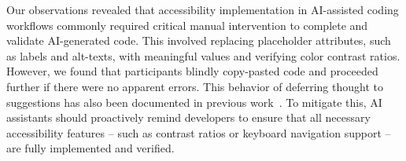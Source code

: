 \begin{highlight}
\end{highlight}
Our observations revealed that accessibility implementation in AI-assisted coding workflows commonly required critical manual intervention to complete and validate AI-generated code. This involved replacing placeholder attributes, such as labels and alt-texts, with meaningful values and verifying color contrast ratios. However, we found that participants blindly copy-pasted code and proceeded further if there were no apparent errors. This behavior of deferring thought to suggestions has also been documented in previous work~\cite{mozannar2024reading}. To mitigate this, AI assistants should proactively remind developers to ensure that all necessary accessibility features -- such as contrast ratios or keyboard navigation support -- are fully implemented and verified.